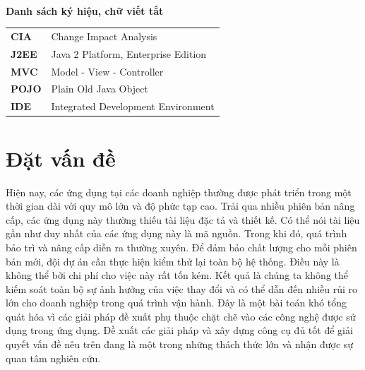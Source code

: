\documentclass[12pt]{report}
\begin{document}
\newpage
\begin{titlepage}
\tableofcontents
\end{titlepage}

\newpage
\begin{titlepage}
\listoftables

\hfill\\[2cm]

\begin{flushleft}
\bfseries{\Huge{Danh sách ký hiệu, chữ viết tắt}}
\end{flushleft}
\begin{table}[h]
	\centering
	\begin{tabular}{ll}
		\textbf{CIA}  & Change Impact Analysis              \\[0.3cm]
		\textbf{J2EE} & Java 2 Platform, Enterprise Edition \\[0.3cm]
		\textbf{MVC} & Model - View - Controller			\\[0.3cm]
		\textbf{POJO} & Plain Old Java Object              \\[0.3cm]
		\textbf{IDE} & Integrated Development Environment \\[0.3cm]
	\end{tabular}
\end{table}
\end{titlepage}

\newpage
\begin{titlepage}
	\listoffigures
\end{titlepage}

\newpage
\setcounter{page}{1}
\chapter{Đặt vấn đề}
\label{chap:intro}
Hiện nay, các ứng dụng tại các doanh nghiệp thường được phát triển trong một thời gian
dài với quy mô lớn và độ phức tạp cao. Trải qua nhiều phiên bản nâng cấp, các ứng dụng
này thường thiếu tài liệu đặc tả và thiết kế. Có thể nói tài liệu gần như duy nhất của các
ứng dụng này là mã nguồn. Trong khi đó, quá trình bảo trì và nâng cấp diễn ra thường
xuyên. Để đảm bảo chất lượng cho mỗi phiên bản mới, đội dự án cần thực hiện kiểm thử
lại toàn bộ hệ thống. Điều này là không thể bởi chi phí cho việc này rất tốn kém. Kết quả
là chúng ta không thể kiếm soát toàn bộ sự ảnh hưởng của việc thay đổi và có thể dẫn đến
nhiều rủi ro lớn cho doanh nghiệp trong quá trình vận hành. Đây là một bài toán khó tổng
quát hóa vì các giải pháp đề xuất phụ thuộc chặt chẽ vào các công nghệ được sử dụng
trong ứng dụng. Đề xuất các giải pháp và xây dựng công cụ đủ tốt để giải quyết vấn đề
nêu trên đang là một trong những thách thức lớn và nhận được sự quan tâm nghiên cứu.
\end{document}
